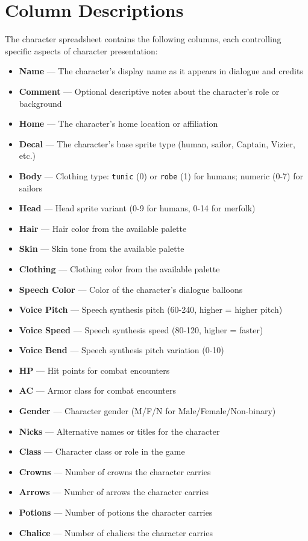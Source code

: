 \documentclass[11pt,letterpaper,oldstylefigures]{memoir}
\newcommand{\paragraphbreak}{\vspace{0.5em}}
\begin{document}
\section{Column Descriptions}
\paragraphbreak
The character spreadsheet contains the following columns, each controlling specific aspects of character presentation:
\begin{itemize}
\item \textbf{Name} — The character's display name as it appears in dialogue and credits
\item \textbf{Comment} — Optional descriptive notes about the character's role or background
\item \textbf{Home} — The character's home location or affiliation
\item \textbf{Decal} — The character's base sprite type (human, sailor, Captain, Vizier, etc.)
\item \textbf{Body} — Clothing type: \texttt{tunic} (0) or \texttt{robe} (1) for humans; numeric (0-7) for sailors
\item \textbf{Head} — Head sprite variant (0-9 for humans, 0-14 for merfolk)
\item \textbf{Hair} — Hair color from the available palette
\item \textbf{Skin} — Skin tone from the available palette
\item \textbf{Clothing} — Clothing color from the available palette
\item \textbf{Speech Color} — Color of the character's dialogue balloons
\item \textbf{Voice Pitch} — Speech synthesis pitch (60-240, higher = higher pitch)
\item \textbf{Voice Speed} — Speech synthesis speed (80-120, higher = faster)
\item \textbf{Voice Bend} — Speech synthesis pitch variation (0-10)
\item \textbf{HP} — Hit points for combat encounters
\item \textbf{AC} — Armor class for combat encounters
\item \textbf{Gender} — Character gender (M/F/N for Male/Female/Non-binary)
\item \textbf{Nicks} — Alternative names or titles for the character
\item \textbf{Class} — Character class or role in the game
\item \textbf{Crowns} — Number of crowns the character carries
\item \textbf{Arrows} — Number of arrows the character carries
\item \textbf{Potions} — Number of potions the character carries
\item \textbf{Chalice} — Number of chalices the character carries
\end{itemize}
\end{document}
